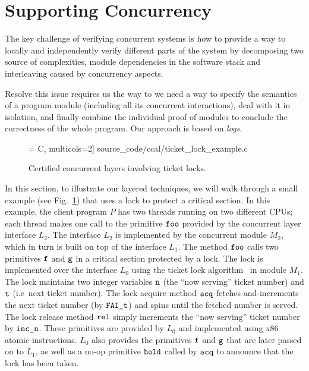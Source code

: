 \section{Supporting Concurrency}
\label{chapter:ccal:sec:ccal-overview}

The key challenge of verifying concurrent systems is how to
provide a way to locally and independently verify different parts of the system 
by decomposing
two source of complexities, module dependencies in the software stack and interleaving caused by concurrency aspects.

%

Resolve this issue requires us the way to 
we need a way
to specify the semantics of a program module (including all its
concurrent interactions), deal with it in isolation, and finally
combine the individual proof of modules to
conclude the correctness of the whole program. 
 Our approach is based on
\emph{logs}.

\begin{figure}
 = C, multicols=2] {source_code/ccal/ticket_lock_example.c}
\caption{Certified concurrent layers involving ticket locks.}
\label{fig:exp:ticket_lock_example}
\end{figure}

In this section, to illustrate our layered techniques, we will walk through a small  example
(see Fig.~\ref{fig:exp:ticket_lock_example}) that uses a lock to protect a
critical section. In this example, the client program $P$ has two threads running on
two different CPUs; each thread makes one call to the primitive
${\mathrm{\texttt{foo}}}$ provided by the concurrent  layer interface $L_2$. 
The interface
$L_2$ is implemented by the concurrent  module $M_2$, which in
turn is built on top of the interface $L_1$. The method ${\mathrm{\texttt{foo}}}$
calls two primitives ${\mathrm{\texttt{f}}}$ and ${\mathrm{\texttt{g}}}$ in a critical section
protected by a lock.  The lock is implemented over the
interface $L_0$ using the ticket lock
algorithm~\cite{mcs91} in module $M_1$.  The lock maintains two 
integer variables ${\mathrm{\texttt{n}}}$ (the ``now serving'' ticket number) and ${\mathrm{\texttt{t}}}$ (i.e\, next ticket number). The lock acquire method ${\mathrm{\texttt{acq}}}$ fetches-and-increments the next ticket number (by ${\mathrm{\texttt{FAI\_t}}}$) 
and spins until the fetched  number is served.
The lock release method ${\mathrm{\texttt{rel}}}$ simply increments the ``now serving'' ticket number by ${\mathrm{\texttt{inc\_n}}}$. These primitives are provided by $L_0$ and  implemented using x86 atomic instructions. $L_0$ also provides the primitives ${\mathrm{\texttt{f}}}$ and ${\mathrm{\texttt{g}}}$ that are later passed on to $L_1$,
as well as a no-op primitive ${\mathrm{\texttt{hold}}}$ called by ${\mathrm{\texttt{acq}}}$ to
announce that the lock has been taken.


